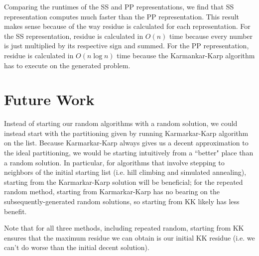 \documentclass[a4paper]{article}
\begin{document}
	Comparing the runtimes of the SS and PP representations, we find that SS representation computes much faster than the PP representation. This result makes sense because of the way residue is calculated for each representation. For the SS representation, residue is calculated in $O(n)$ time because every number is just multiplied by its respective sign and summed. For the PP representation, residue is calculated in $O(n\log n)$ time because the Karmankar-Karp algorithm has to execute on the generated problem.

	
	\section{Future Work}
	
	Instead of starting our random algorithms with a random solution, we could instead start with the partitioning given by running Karmarkar-Karp algorithm on the list. Because Karmarkar-Karp always gives us a decent approximation to the ideal partitioning, we would be starting intuitively from a ``better" place than a random solution. In particular, for algorithms that involve stepping to neighbors of the initial starting list (i.e. hill climbing and simulated annealing), starting from the Karmarkar-Karp solution will be beneficial; for the repeated random method, starting from Karmarkar-Karp has no bearing on the subsequently-generated random solutions, so starting from KK likely has less benefit.
	
	Note that for all three methods, including repeated random, starting from KK ensures that the maximum residue we can obtain is our initial KK residue (i.e. we can't do worse than the initial decent solution).
	
\end{document}

